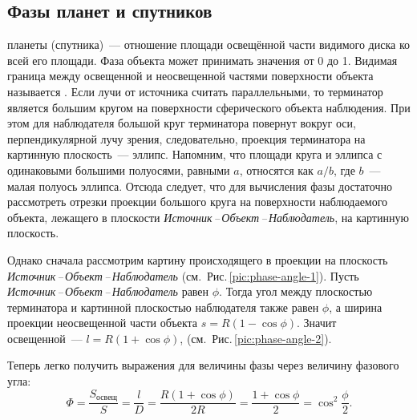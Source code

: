 \subsection{Фазы планет и спутников}

 планеты (спутника)~--- отношение площади освещённой  части видимого диска ко всей его площади. Фаза объекта может принимать значения от 0 до 1. Видимая граница между освещенной и неосвещенной частями поверхности объекта называется . Если лучи от источника считать параллельными, то терминатор является большим кругом на поверхности сферического объекта наблюдения. При этом для наблюдателя большой круг терминатора повернут вокруг оси, перпендикулярной лучу зрения, следовательно, проекция терминатора на картинную плоскость~--- эллипс. Напомним, что площади круга и эллипса с одинаковыми большими полуосями, равными $a$, относятся как $a/b$, где $b$~--- малая полуось эллипса. Отсюда следует, что для вычисления фазы достаточно рассмотреть отрезки проекции большого круга на поверхности наблюдаемого объекта, лежащего в плоскости {\slshape Источник\,--\,Объект\,--\,Наблюдатель}, на картинную плоскость.


Однако сначала рассмотрим картину происходящего в проекции на плоскость {\slshape Источник\,--\,Объект\,--\,Наблюдатель} (см.~Рис.\,\ref{pic:phase-angle-1}). Пусть  {\slshape Источник\,--\,Объект\,--\,Наблюдатель} равен $\phi$. Тогда угол между плоскостью терминатора и картинной плоскостью наблюдателя также равен $\phi$, а ширина проекции неосвещенной части объекта $s = R(1 - \cos \phi)$. Значит освещенной~--- $l = R( 1+ \cos \phi)$, (см.~Рис.\,\ref{pic:phase-angle-2}).

Теперь легко получить выражения для величины фазы через величину фазового угла:
\begin{equation}
    \Phi = \frac{S_\text{освещ}}{S} = \frac{l}{D} = \frac{R ( 1 + \cos \phi )}{2R} = \frac{1 + \cos \phi}{2} =  \cos^2 \frac{\phi}{2}.
\end{equation}

